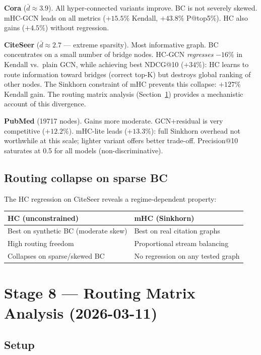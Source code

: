 \documentclass[11pt,a4paper]{article}
\begin{document}
\textbf{Cora} ($\bar{d}\approx3.9$). All hyper-connected variants improve.
BC is not severely skewed. mHC-GCN leads on all metrics
($+15.5\%$ Kendall, $+43.8\%$ P@top5\%).
HC also gains ($+4.5\%$) without regression.

\textbf{CiteSeer} ($\bar{d}\approx2.7$ --- extreme sparsity).
Most informative graph. BC concentrates on a small number of bridge nodes.
HC-GCN \emph{regresses} $-16\%$ in Kendall vs.\ plain GCN,
while achieving best NDCG@10 ($+34\%$):
HC learns to route information toward bridges (correct top-K)
but destroys global ranking of other nodes.
The Sinkhorn constraint of mHC prevents this collapse:
$+127\%$ Kendall gain.
The routing matrix analysis (Section~\ref{sec:matrices}) provides
a mechanistic account of this divergence.

\textbf{PubMed} (19717 nodes).
Gains more moderate. GCN+residual is very competitive ($+12.2\%$).
mHC-lite leads ($+13.3\%$): full Sinkhorn overhead not worthwhile
at this scale; lighter variant offers better trade-off.
Precision@10 saturates at 0.5 for all models (non-discriminative).

\subsection{Routing collapse on sparse BC}

The HC regression on CiteSeer reveals a regime-dependent property:
\begin{center}
\begin{tabular}{L{5.5cm} L{5.5cm}}
\toprule
\textbf{HC (unconstrained)} & \textbf{mHC (Sinkhorn)} \\
\midrule
Best on synthetic BC (moderate skew) & Best on real citation graphs \\
High routing freedom & Proportional stream balancing \\
Collapses on sparse/skewed BC & No regression on any tested graph \\
\bottomrule
\end{tabular}
\end{center}

\section{Stage 8 --- Routing Matrix Analysis (2026-03-11)}
\label{sec:matrices}

\subsection{Setup}
\end{document}
